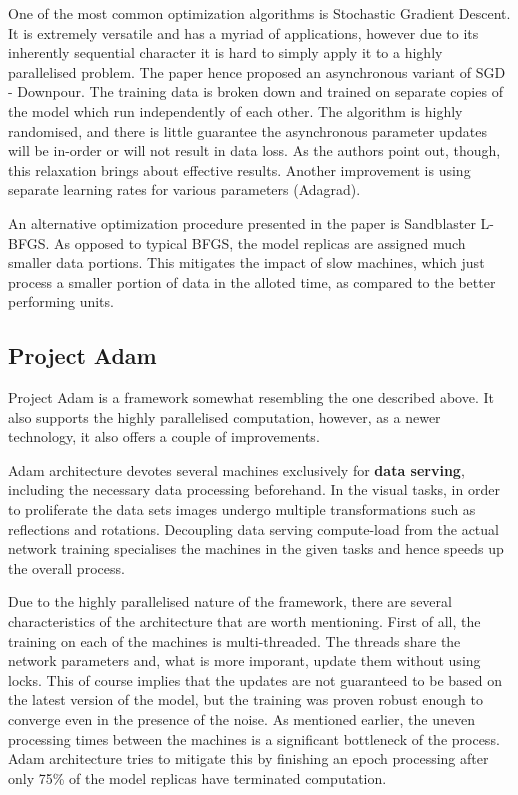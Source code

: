 \documentclass[a4paper, 11pt]{article}
\numberwithin{equation}{section}
\begin{document}
		One of the most common optimization algorithms is Stochastic Gradient Descent. It is extremely versatile and has a myriad of applications, however due to its inherently sequential character it is hard to simply apply it to a highly parallelised problem. The paper hence proposed an asynchronous variant of SGD - Downpour. The training data is broken down and trained on separate copies of the model which run independently of each other. The algorithm is highly randomised, and there is little guarantee the asynchronous parameter updates will be in-order or will not result in data loss. As the authors point out, though, this relaxation brings about effective results. Another improvement is using separate learning rates for various parameters (Adagrad).
		
		An alternative optimization procedure presented in the paper is Sandblaster L-BFGS. As opposed to typical BFGS, the model replicas are assigned much smaller data portions. This mitigates the impact of slow machines, which just process a smaller portion of data in the alloted time, as compared to the better performing units.		 
		
		\subsection{Project Adam}
		
		Project Adam is a framework somewhat resembling the one described above. It also supports the highly parallelised computation, however, as a newer technology, it also offers a couple of improvements.
		
		Adam architecture devotes several machines exclusively for \textbf{data serving}, including the necessary data processing beforehand. In the visual tasks, in order to proliferate the data sets images undergo multiple transformations such as reflections and rotations. Decoupling data serving compute-load from the actual network training specialises the machines in the given tasks and hence speeds up the overall process.
		
		Due to the highly parallelised nature of the framework, there are several characteristics of the architecture that are worth mentioning. First of all, the training on each of the machines is multi-threaded. The threads share the network parameters and, what is more imporant, update them without using locks. This of course implies that the updates are not guaranteed to be based on the latest version of the model, but the training was proven robust enough to converge even in the presence of the noise. As mentioned earlier, the uneven processing times between the machines is a significant bottleneck of the process. Adam architecture tries to mitigate this by finishing an epoch processing after only 75\% of the model replicas have terminated computation.
		
\end{document}
